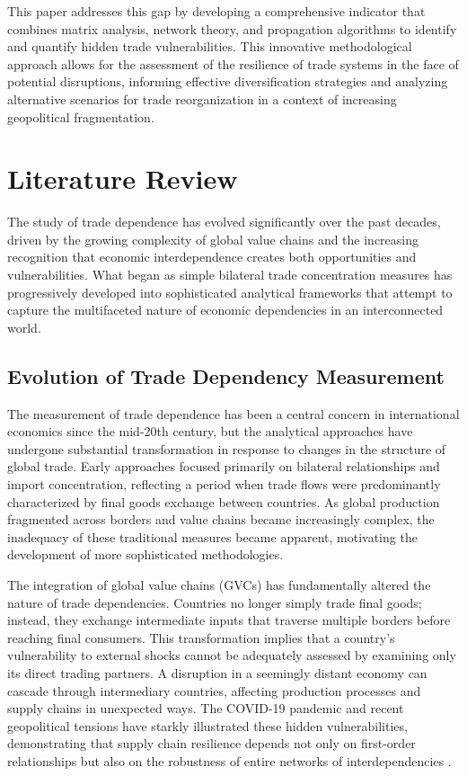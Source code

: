 \documentclass[final,1p,times,authoryear]{elsarticle}
\begin{document}
This paper addresses this gap by developing a comprehensive indicator that combines matrix analysis, network theory, and propagation algorithms to identify and quantify hidden trade vulnerabilities. This innovative methodological approach allows for the assessment of the resilience of trade systems in the face of potential disruptions, informing effective diversification strategies and analyzing alternative scenarios for trade reorganization in a context of increasing geopolitical fragmentation.

\section{Literature Review}

The study of trade dependence has evolved significantly over the past decades, driven by the growing complexity of global value chains and the increasing recognition that economic interdependence creates both opportunities and vulnerabilities. What began as simple bilateral trade concentration measures has progressively developed into sophisticated analytical frameworks that attempt to capture the multifaceted nature of economic dependencies in an interconnected world.

\subsection{Evolution of Trade Dependency Measurement}

The measurement of trade dependence has been a central concern in international economics since the mid-20th century, but the analytical approaches have undergone substantial transformation in response to changes in the structure of global trade. Early approaches focused primarily on bilateral relationships and import concentration, reflecting a period when trade flows were predominantly characterized by final goods exchange between countries. As global production fragmented across borders and value chains became increasingly complex, the inadequacy of these traditional measures became apparent, motivating the development of more sophisticated methodologies.

The integration of global value chains (GVCs) has fundamentally altered the nature of trade dependencies. Countries no longer simply trade final goods; instead, they exchange intermediate inputs that traverse multiple borders before reaching final consumers. This transformation implies that a country's vulnerability to external shocks cannot be adequately assessed by examining only its direct trading partners. A disruption in a seemingly distant economy can cascade through intermediary countries, affecting production processes and supply chains in unexpected ways. The COVID-19 pandemic and recent geopolitical tensions have starkly illustrated these hidden vulnerabilities, demonstrating that supply chain resilience depends not only on first-order relationships but also on the robustness of entire networks of interdependencies \citep{Baldwin2020, StollThethi2022}.
\end{document}
